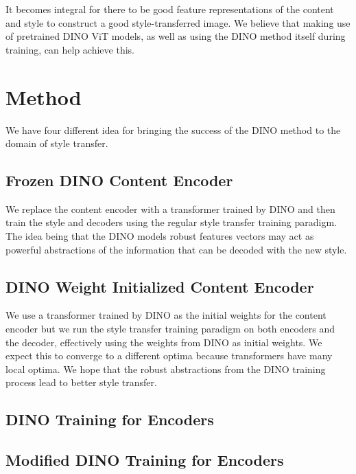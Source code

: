 \documentclass{article}
\begin{document}
It becomes integral for there to be good feature representations of the content and style to construct a good style-transferred image. We believe that making use of pretrained DINO ViT models, as well as using the DINO method itself during training, can help achieve this.


\section{Method}

We have four different idea for bringing the success of the DINO method to the domain of style transfer.

\subsection{Frozen DINO Content Encoder}

We replace the content encoder with a transformer trained by DINO and then train the style and decoders using the regular style transfer training paradigm. The idea being that the DINO models robust features vectors may act as powerful abstractions of the information that can be decoded with the new style.

\subsection{DINO Weight Initialized Content Encoder}

We use a transformer trained by DINO as the initial weights for the content encoder but we run the style transfer training paradigm on both encoders and the decoder, effectively using the weights from DINO as initial weights. We expect this to converge to a different optima because transformers have many local optima. We hope that the robust abstractions from the DINO training process lead to better style transfer.

\subsection{DINO Training for Encoders}



\subsection{Modified DINO Training for Encoders}




\medskip

\nocite{*}


\end{document}
